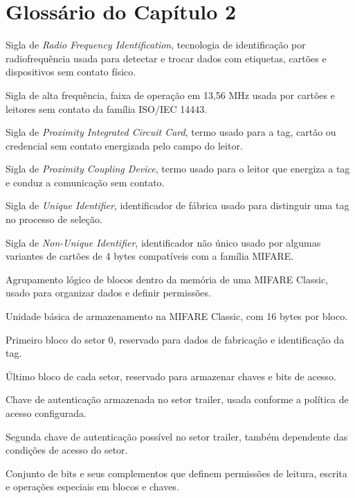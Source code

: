 \chapter*{Glossário do Capítulo 2}

\begin{description}[
  font=\normalfont\bfseries,
  style=multiline,
  leftmargin=5.6cm,
  labelwidth=4.9cm,
  labelsep=0.35cm,
  itemsep=0.55\baselineskip
]
  \item[RFID] Sigla de \textit{Radio Frequency Identification}, tecnologia de identificação por radiofrequência usada para detectar e trocar dados com etiquetas, cartões e dispositivos sem contato físico.
  \item[HF] Sigla de alta frequência, faixa de operação em 13,56 MHz usada por cartões e leitores sem contato da família ISO/IEC 14443.
  \item[PICC] Sigla de \textit{Proximity Integrated Circuit Card}, termo usado para a tag, cartão ou credencial sem contato energizada pelo campo do leitor.
  \item[PCD] Sigla de \textit{Proximity Coupling Device}, termo usado para o leitor que energiza a tag e conduz a comunicação sem contato.
  \item[UID] Sigla de \textit{Unique Identifier}, identificador de fábrica usado para distinguir uma tag no processo de seleção.
  \item[NUID] Sigla de \textit{Non-Unique Identifier}, identificador não único usado por algumas variantes de cartões de 4 bytes compatíveis com a família MIFARE.
  \item[Setor] Agrupamento lógico de blocos dentro da memória de uma MIFARE Classic, usado para organizar dados e definir permissões.
  \item[Bloco] Unidade básica de armazenamento na MIFARE Classic, com 16 bytes por bloco.
  \item[Bloco de fabricante] Primeiro bloco do setor 0, reservado para dados de fabricação e identificação da tag.
  \item[Setor trailer] Último bloco de cada setor, reservado para armazenar chaves e bits de acesso.
  \item[Key A] Chave de autenticação armazenada no setor trailer, usada conforme a política de acesso configurada.
  \item[Key B] Segunda chave de autenticação possível no setor trailer, também dependente das condições de acesso do setor.
  \item[Bits de acesso] Conjunto de bits e seus complementos que definem permissões de leitura, escrita e operações especiais em blocos e chaves.

\end{description}
